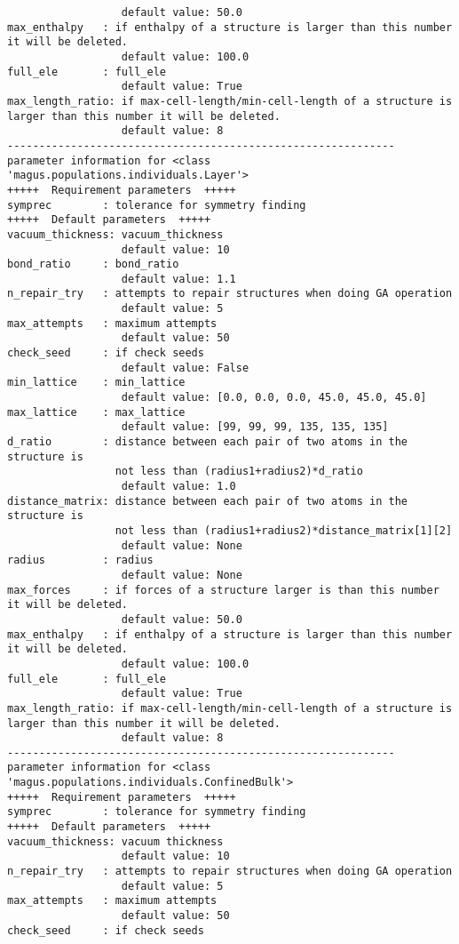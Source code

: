 \documentclass[12pt,oneside]{book}
\begin{document}
\begin{tcolorbox}
\begin{verbatim}
                  default value: 50.0
max_enthalpy   : if enthalpy of a structure is larger than this number it will be deleted.
                  default value: 100.0
full_ele       : full_ele
                  default value: True
max_length_ratio: if max-cell-length/min-cell-length of a structure is larger than this number it will be deleted.
                  default value: 8
-------------------------------------------------------------
parameter information for <class 'magus.populations.individuals.Layer'>
+++++  Requirement parameters  +++++
symprec        : tolerance for symmetry finding
+++++  Default parameters  +++++
vacuum_thickness: vacuum_thickness
                  default value: 10
bond_ratio     : bond_ratio
                  default value: 1.1
n_repair_try   : attempts to repair structures when doing GA operation
                  default value: 5
max_attempts   : maximum attempts
                  default value: 50
check_seed     : if check seeds
                  default value: False
min_lattice    : min_lattice
                  default value: [0.0, 0.0, 0.0, 45.0, 45.0, 45.0]
max_lattice    : max_lattice
                  default value: [99, 99, 99, 135, 135, 135]
d_ratio        : distance between each pair of two atoms in the structure is
                 not less than (radius1+radius2)*d_ratio
                  default value: 1.0
distance_matrix: distance between each pair of two atoms in the structure is
                 not less than (radius1+radius2)*distance_matrix[1][2]
                  default value: None
radius         : radius
                  default value: None
max_forces     : if forces of a structure larger is than this number it will be deleted.
                  default value: 50.0
max_enthalpy   : if enthalpy of a structure is larger than this number it will be deleted.
                  default value: 100.0
full_ele       : full_ele
                  default value: True
max_length_ratio: if max-cell-length/min-cell-length of a structure is larger than this number it will be deleted.
                  default value: 8
-------------------------------------------------------------
parameter information for <class 'magus.populations.individuals.ConfinedBulk'>
+++++  Requirement parameters  +++++
symprec        : tolerance for symmetry finding
+++++  Default parameters  +++++
vacuum_thickness: vacuum thickness
                  default value: 10
n_repair_try   : attempts to repair structures when doing GA operation
                  default value: 5
max_attempts   : maximum attempts
                  default value: 50
check_seed     : if check seeds

\end{verbatim}
\end{tcolorbox}
\end{document}
